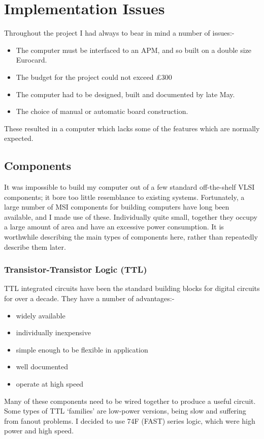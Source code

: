 \chapter{Implementation Issues}

Throughout the project I had always to bear in mind a number of issues:-
\begin{itemize}
\item 
The computer must be interfaced to an APM, and so  built on a double size Eurocard.
\item
The budget for the project could not exceed \pounds 300
\item
The computer had to be designed, built and documented by late May.
\item
The choice of manual or automatic board construction.
\end{itemize}
These  resulted in a computer which lacks some of the features which are  normally expected.

\section{Components}


It was impossible to build my computer out of a few standard off-the-shelf VLSI components; it bore too little resemblance to existing systems. Fortunately, a large number of MSI components for building computers have long been available, and I  made use of these.
Individually quite small, together they  occupy a large amount of area  and have an excessive power consumption. 
It is worthwhile describing the main types of components here, rather than repeatedly describe them later.

\subsection{Transistor-Transistor Logic (TTL)}
TTL integrated circuits have been the standard building blocks for digital circuits for over a decade. They have a number of advantages:-
\begin{itemize}
\item widely available
\item individually inexpensive
\item simple enough to be  flexible in application
\item well documented
\item  operate at high speed
\end{itemize}
 Many of these  components need to be wired together to produce a useful circuit. Some types of TTL `families' are low-power versions, being slow and suffering from fanout problems. I decided to use 74F (FAST) series logic, which were high power and high speed. 


